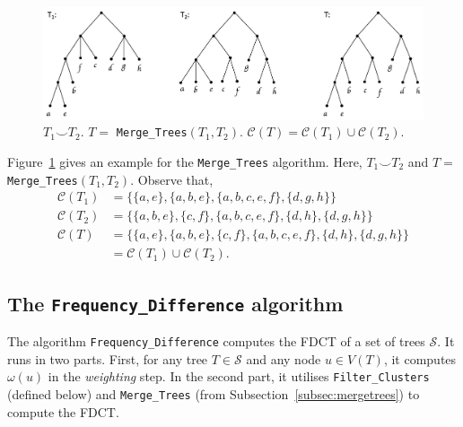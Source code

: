 \documentclass{article}
\newcommand{\compatible}{\smile}
\newcommand{\weight}{\omega}
\begin{document}
    \begin{figure}[ht]
        \includegraphics[scale=0.5]{mergetrees}
        \centering
        \caption[The \texttt{Merge\_Trees} algorithm]{$T_1 \compatible T_2$. $T =$ \texttt{Merge\_Trees}$(T_1, T_2)$. $\mathcal{C}(T) = \mathcal{C}(T_1) \cup \mathcal{C}(T_2)$.}
        \label{fig:mergetrees}
    \end{figure}

    Figure~\ref{fig:mergetrees} gives an example for the \texttt{Merge\_Trees} algorithm. Here, $T_1 \compatible T_2$ and $T =$ \texttt{Merge\_Trees}$(T_1, T_2)$. Observe that,
    \begin{align*}
        \mathcal{C}(T_1) &= \{\{a, e\}, \{a, b, e\}, \{a, b, c, e, f\}, \{d, g, h\}\}\\
        \mathcal{C}(T_2) &= \{\{a, b, e\}, \{c, f\}, \{a, b, c, e, f\}, \{d, h\}, \{d, g, h\}\}\\
        \mathcal{C}(T) &= \{\{a, e\}, \{a, b, e\}, \{c, f\}, \{a, b, c, e, f\}, \{d, h\}, \{d, g, h\}\}\\
        &= \mathcal{C}(T_1) \cup \mathcal{C}(T_2).
    \end{align*}

    \subsection{The \texttt{Frequency\_Difference} algorithm}

    The algorithm \texttt{Frequency\_Difference} \cite{jansson2018algorithms} computes the FDCT of a set of trees $\mathcal{S}$. It runs in two parts. First, for any tree $T \in \mathcal{S}$ and any node $u \in V(T)$, it computes $\weight(u)$ in the \textit{weighting} step. In the second part, it utilises \texttt{Filter\_Clusters} (defined below) and \texttt{Merge\_Trees} (from Subsection~\ref{subsec:mergetrees}) to compute the FDCT.
\end{document}
